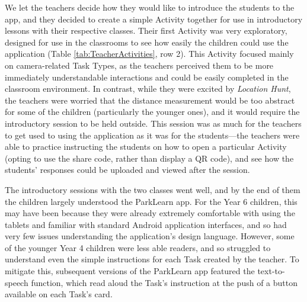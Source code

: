 We let the teachers decide how they would like to introduce the students to the app, and they decided to create a simple Activity together for use in introductory lessons with their respective classes. Their first Activity was very exploratory, designed for use in the classrooms to see how easily the children could use the application (Table \ref{tab:TeacherActivities}, row 2). This Activity focused mainly on camera-related Task Types, as the teachers perceived them to be more immediately understandable interactions and could be easily completed in the classroom environment. In contrast, while they were excited by \textit{Location Hunt}, the teachers were worried that the distance measurement would be too abstract for some of the children (particularly the younger ones), and it would require the introductory session to be held outside. This session was as much for the teachers to get used to using the application as it was for the students---the teachers were able to practice instructing the students on how to open a particular Activity (opting to use the share code, rather than display a QR code), and see how the students' responses could be uploaded and viewed after the session.

The introductory sessions with the two classes went well, and by the end of them the children largely understood the ParkLearn app. For the Year 6 children, this may have been because they were already extremely comfortable with using the tablets and familiar with standard Android application interfaces, and so had very few issues understanding the application’s design language. However, some of the younger Year 4 children were less able readers, and so struggled to understand even the simple instructions for each Task created by the teacher. To mitigate this, subsequent versions of the ParkLearn app featured the text-to-speech function, which read aloud the Task’s instruction at the push of a button available on each Task's card.

